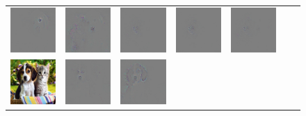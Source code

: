 \begin{figure}
\begin{center}
\begin{tabular}{ccccccc}
\includegraphics[width=0.14\linewidth,height=0.115\linewidth]{figs/class_compare/googlenet/soft/dog-cat1_diff_163} &
\includegraphics[width=0.14\linewidth,height=0.115\linewidth]{figs/class_compare/googlenet/soft/dog-cat1_diff_188} &
\includegraphics[width=0.14\linewidth,height=0.115\linewidth]{figs/class_compare/googlenet/soft/dog-cat1_diff_279} &
\includegraphics[width=0.14\linewidth,height=0.115\linewidth]{figs/class_compare/googlenet/soft/dog-cat1_diff_293} &
\includegraphics[width=0.14\linewidth,height=0.115\linewidth]{figs/class_compare/googlenet/soft/dog-cat1_diff_10} \\
\vspace{-2.5pt}
\includegraphics[width=0.14\linewidth,height=0.115\linewidth]{figs/class_compare/googlenet/soft/dog-cat2} &
\includegraphics[width=0.14\linewidth,height=0.115\linewidth]{figs/class_compare/googlenet/soft/dog-cat2_diff_258} &
\includegraphics[width=0.14\linewidth,height=0.115\linewidth]{figs/class_compare/googlenet/soft/dog-cat2_diff_163} &

\end{tabular}
\end{center}
\end{figure}

